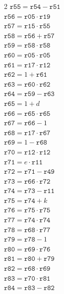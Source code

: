 \documentclass[9pt]{article}
\begin{document}
\begin{multicols}{2}
\(\mathtt{r55} = \mathtt{r54} - \mathtt{r51}\)\\
\(\mathtt{r56} = \mathtt{r05} \cdot \mathtt{r19}\)\\
\(\mathtt{r57} = \mathtt{r15} \cdot \mathtt{r55}\)\\
\(\mathtt{r58} = \mathtt{r56} + \mathtt{r57}\)\\
\(\mathtt{r59} = \mathtt{r58} \cdot \mathtt{r58}\)\\
\(\mathtt{r60} = \mathtt{r05} \cdot \mathtt{r05}\)\\
\(\mathtt{r61} = \mathtt{r17} \cdot \mathtt{r12}\)\\
\(\mathtt{r62} = 1 + \mathtt{r61}\)\\
\(\mathtt{r63} = \mathtt{r60} \cdot \mathtt{r62}\)\\
\(\mathtt{r64} = \mathtt{r59} - \mathtt{r63}\)\\
\(\mathtt{r65} = 1 + d\)\\
\(\mathtt{r66} = \mathtt{r65} \cdot \mathtt{r65}\)\\
\(\mathtt{r67} = \mathtt{r66} - 1\)\\
\(\mathtt{r68} = \mathtt{r17} \cdot \mathtt{r67}\)\\
\(\mathtt{r69} = 1 - \mathtt{r68}\)\\
\(\mathtt{r70} = \mathtt{r12} \cdot \mathtt{r12}\)\\
\(\mathtt{r71} = e \cdot \mathtt{r11}\)\\
\(\mathtt{r72} = \mathtt{r71} - \mathtt{r49}\)\\
\(\mathtt{r73} = \mathtt{r66} \cdot \mathtt{r72}\)\\
\(\mathtt{r74} = \mathtt{r73} - \mathtt{r11}\)\\
\(\mathtt{r75} = \mathtt{r74} + k\)\\
\(\mathtt{r76} = \mathtt{r75} \cdot \mathtt{r75}\)\\
\(\mathtt{r77} = \mathtt{r74} \cdot \mathtt{r74}\)\\
\(\mathtt{r78} = \mathtt{r68} \cdot \mathtt{r77}\)\\
\(\mathtt{r79} = \mathtt{r78} - 1\)\\
\(\mathtt{r80} = \mathtt{r69} \cdot \mathtt{r76}\)\\
\(\mathtt{r81} = \mathtt{r80} + \mathtt{r79}\)\\
\(\mathtt{r82} = \mathtt{r68} \cdot \mathtt{r69}\)\\
\(\mathtt{r83} = \mathtt{r70} \cdot \mathtt{r81}\)\\
\(\mathtt{r84} = \mathtt{r83} - \mathtt{r82}\)\\

\end{multicols}
\end{document}
